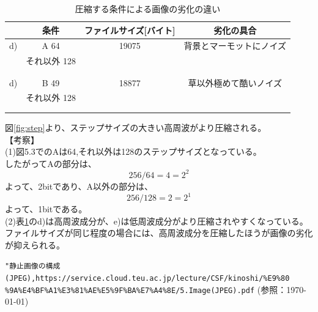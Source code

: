\documentclass[uplatex, titlepage]{jsarticle}
\begin{document}
\begin{table}[H]
  \centering
  \caption{圧縮する条件による画像の劣化の違い}
  \label{table:zyoukenrekka}
  \begin{tabular}{|c|c|c|c|} \hline
     & 条件 & ファイルサイズ[バイト] & 劣化の具合 \\ \hline
    d) & A 64 & 19075 & 背景とマーモットにノイズ   \\ %
     & それ以外 128 &  &    \\ %
     &  &  &    \\ %
     &  &  &    \\ \hline
    d) & B 49 & 18877 & 草以外極めて酷いノイズ   \\ %
     & それ以外 128 &  &    \\ %
     &  &  &    \\ %
     &  &  &    \\ \hline
  \end{tabular}
\end{table}

  図\ref{fig:step}より、ステップサイズの大きい高周波がより圧縮される。\\

【考察】\\
(1)図5.3でのAは64,それ以外は128のステップサイズとなっている。　\\
  したがってAの部分は、 \\
\begin{equation}
  256 / 64 = 4 = 2^2
\end{equation}
  よって、2bitであり、A以外の部分は、 \\
\begin{equation}
  256 / 128 = 2 = 2^1
\end{equation}
  よって、1bitである。 \\
(2)表\ref{table:zyoukenrekka}のd)は高周波成分が、e)は低周波成分がより圧縮されやすくなっている。ファイルサイズが同じ程度の場合には、高周波成分を圧縮したほうが画像の劣化が抑えられる。 \\


\begin{thebibliography}{99}
   \verb+"静止画像の構成(JPEG),https://service.cloud.teu.ac.jp/lecture/CSF/kinoshi/%E9%80+
  \verb+%9A%E4%BF%A1%E3%81%AE%E5%9F%BA%E7%A4%8E/5.Image(JPEG).pdf+
  (参照：\today)
  \end{thebibliography}
\end{document}
